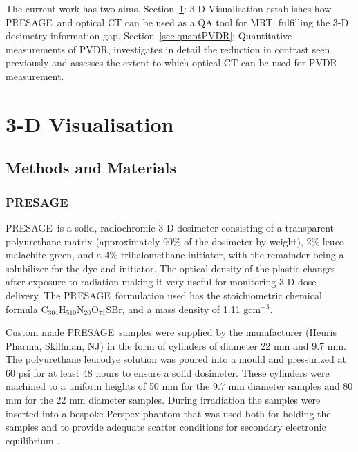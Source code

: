	The current work  has two aims. Section~\ref{sec:3dvis}: 3-D Visualisation establishes how PRESAGE\textregistered \ and optical CT can be used as a QA tool for MRT, fulfilling the 3-D dosimetry information gap. Section~\ref{sec:quantPVDR}: Quantitative measurements of PVDR, investigates in detail the reduction in contrast seen previously and assesses the extent to which optical CT can be used for PVDR measurement. 
	

		
		
		
	
	\section{3-D Visualisation}
	\label{sec:3dvis}
	\subsection{Methods and Materials}
	
	\subsubsection{PRESAGE\textregistered}
		
	PRESAGE\textregistered \ is a solid, radiochromic 3-D dosimeter consisting of a transparent polyurethane matrix (approximately 90\% of the dosimeter by weight), 2\% leuco malachite green, and a 4\% trihalomethane initiator, with the remainder being a solubilizer for the dye and initiator. \cite{adamovics2003new} The optical density of the plastic changes after exposure to radiation making it very useful for monitoring 3-D dose delivery. 
	The PRESAGE\textregistered \ formulation used  has the stoichiometric chemical formula C$_{304}$H$_{510}$N$_{20}$O$_{71}$SBr, and a mass density of 1.11 gcm$^{-3}$.   
	
	Custom made PRESAGE\textregistered \ samples were supplied by the manufacturer (Heuris Pharma, Skillman, NJ) in the form of cylinders of diameter 22 mm and 9.7 mm. The polyurethane leucodye solution was poured into a mould and pressurized at 60 psi for at least 48 hours to ensure a solid dosimeter. These cylinders were machined to a uniform heights of 50 mm for the 9.7 mm diameter samples and 80 mm for the 22 mm diameter samples. During irradiation the samples were inserted into a bespoke Perspex phantom that was used both for holding the samples and to provide adequate scatter conditions for secondary electronic equilibrium \cite{doranestablishing2013}.
	
